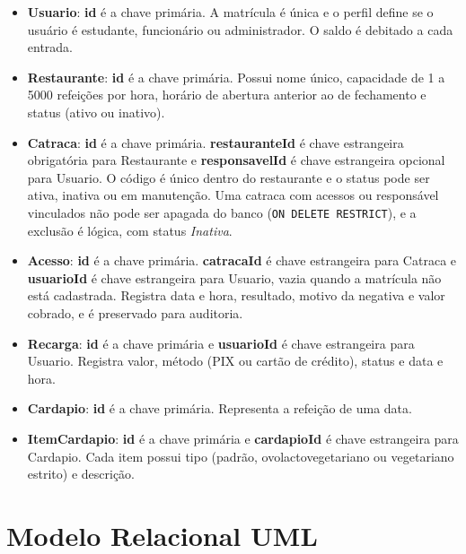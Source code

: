 \documentclass[a4paper,12pt]{article}
\renewcommand{\_}{\textunderscore\allowbreak}
\begin{document}
\begin{itemize}

    \item \textbf{Usuario}: \textbf{id} é a chave primária. A matrícula é única e o perfil define se o usuário é estudante, funcionário ou administrador. O saldo é debitado a cada entrada.

    \item \textbf{Restaurante}: \textbf{id} é a chave primária. Possui nome único, capacidade de 1 a 5000 refeições por hora, horário de abertura anterior ao de fechamento e status (ativo ou inativo).

    \item \textbf{Catraca}: \textbf{id} é a chave primária. \textbf{restauranteId} é chave estrangeira obrigatória para Restaurante e \textbf{responsavelId} é chave estrangeira opcional para Usuario. O código é único dentro do restaurante e o status pode ser ativa, inativa ou em manutenção. Uma catraca com acessos ou responsável vinculados não pode ser apagada do banco (\texttt{ON DELETE RESTRICT}), e a exclusão é lógica, com status \textit{Inativa}.

    \item \textbf{Acesso}: \textbf{id} é a chave primária. \textbf{catracaId} é chave estrangeira para Catraca e \textbf{usuarioId} é chave estrangeira para Usuario, vazia quando a matrícula não está cadastrada. Registra data e hora, resultado, motivo da negativa e valor cobrado, e é preservado para auditoria.

    \item \textbf{Recarga}: \textbf{id} é a chave primária e \textbf{usuarioId} é chave estrangeira para Usuario. Registra valor, método (PIX ou cartão de crédito), status e data e hora.

    \item \textbf{Cardapio}: \textbf{id} é a chave primária. Representa a refeição de uma data.

    \item \textbf{ItemCardapio}: \textbf{id} é a chave primária e \textbf{cardapioId} é chave estrangeira para Cardapio. Cada item possui tipo (padrão, ovolactovegetariano ou vegetariano estrito) e descrição.

\end{itemize}

\section*{Modelo Relacional UML}
\end{document}
